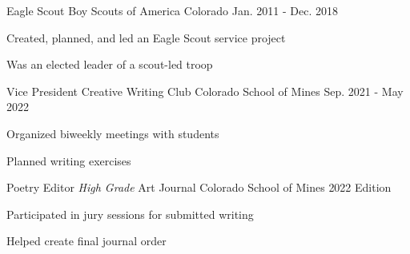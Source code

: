 

\begin{cventries}

  \cventry
    {Eagle Scout}
    {Boy Scouts of America}
    {Colorado}
    {Jan. 2011 - Dec. 2018}
    {
      \begin{cvitems}
        \item {Created, planned, and led an Eagle Scout service project}
        \item {Was an elected leader of a scout-led troop}
      \end{cvitems}
    }

  \cventry
    {Vice President}
    {Creative Writing Club}
    {Colorado School of Mines}
    {Sep. 2021 - May 2022}
    {
      \begin{cvitems}
        \item {Organized biweekly meetings with students}
        \item {Planned writing exercises}
      \end{cvitems}
    }

  \cventry
    {Poetry Editor}
    {\emph{High Grade} Art Journal}
    {Colorado School of Mines}
    {2022 Edition}
    {
      \begin{cvitems}
        \item {Participated in jury sessions for submitted writing}
        \item {Helped create final journal order}
      \end{cvitems}
    }


\end{cventries}
